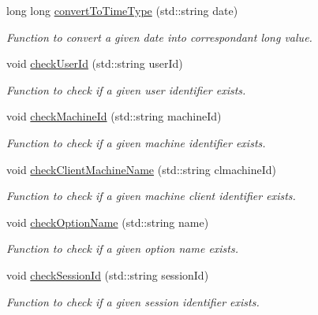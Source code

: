 \begin{DoxyCompactItemize}
long long \hyperlink{classQueryServer_a3b2becf9f1ae6ca1d0097d7400997aa8}{convertToTimeType} (std::string date)
\begin{DoxyCompactList}\small\item\em Function to convert a given date into correspondant long value. \item\end{DoxyCompactList}\item 
void \hyperlink{classQueryServer_a0f5faaf9f4be79361b2eb15e14480a7d}{checkUserId} (std::string userId)
\begin{DoxyCompactList}\small\item\em Function to check if a given user identifier exists. \item\end{DoxyCompactList}\item 
void \hyperlink{classQueryServer_a192112eecd3ec9c706c472d45f82b549}{checkMachineId} (std::string machineId)
\begin{DoxyCompactList}\small\item\em Function to check if a given machine identifier exists. \item\end{DoxyCompactList}\item 
void \hyperlink{classQueryServer_ab05f1d7e54ec0e7bc51772300a7fe9c2}{checkClientMachineName} (std::string clmachineId)
\begin{DoxyCompactList}\small\item\em Function to check if a given machine client identifier exists. \item\end{DoxyCompactList}\item 
void \hyperlink{classQueryServer_addd5852b7271e319daa09c989f23ce83}{checkOptionName} (std::string name)
\begin{DoxyCompactList}\small\item\em Function to check if a given option name exists. \item\end{DoxyCompactList}\item 
void \hyperlink{classQueryServer_aab30c247fe7f71f28ef30d28d78b23e2}{checkSessionId} (std::string sessionId)
\begin{DoxyCompactList}\small\item\em Function to check if a given session identifier exists. \item\end{DoxyCompactList}\item 

\end{DoxyCompactItemize}
